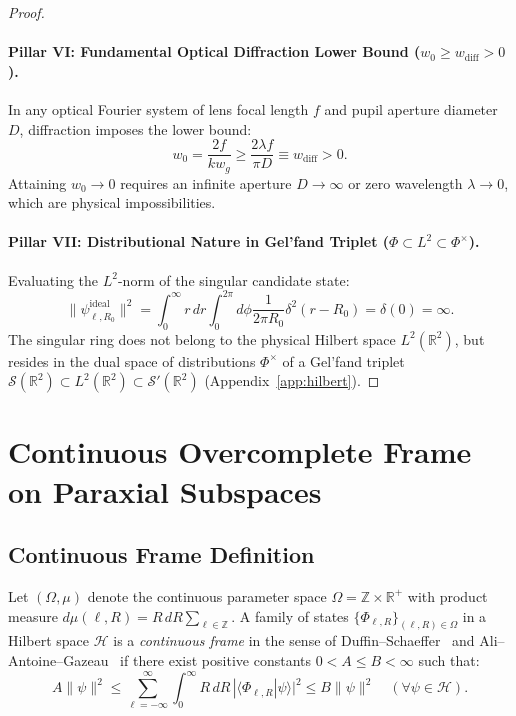 \documentclass[11pt,a4paper]{article}
\begin{document}
\begin{proof}
\paragraph{Pillar VI: Fundamental Optical Diffraction Lower Bound ($w_0 \ge w_{\text{diff}} > 0$).}
In any optical Fourier system of lens focal length $f$ and pupil aperture diameter $D$, diffraction imposes the lower bound:
\begin{equation}
\boxed{w_0 = \frac{2 f}{k w_g} \ge \frac{2 \lambda f}{\pi D} \equiv w_{\text{diff}} > 0.}
\label{eq:pillar6_result}
\end{equation}
Attaining $w_0 \to 0$ requires an infinite aperture $D \to \infty$ or zero wavelength $\lambda \to 0$, which are physical impossibilities.

\paragraph{Pillar VII: Distributional Nature in Gel'fand Triplet ($\Phi \subset L^2 \subset \Phi^\times$).}
Evaluating the $L^2$-norm of the singular candidate state:
\begin{equation}
\boxed{\|\psi_{\ell, R_0}^{\text{ideal}}\|^2 = \int_0^\infty r \, dr \int_0^{2\pi} d\phi \frac{1}{2\pi R_0} \delta^2(r - R_0) = \delta(0) = \infty.}
\label{eq:pillar7_result}
\end{equation}
The singular ring does not belong to the physical Hilbert space $L^2(\mathbb{R}^2)$, but resides in the dual space of distributions $\Phi^\times$ of a Gel'fand triplet $\mathcal{S}(\mathbb{R}^2) \subset L^2(\mathbb{R}^2) \subset \mathcal{S}'(\mathbb{R}^2)$ (Appendix~\ref{app:hilbert}).
\end{proof}

\section{Continuous Overcomplete Frame on Paraxial Subspaces}
\label{sec:frame_theory}

\subsection{Continuous Frame Definition}

Let $(\Omega, \mu)$ denote the continuous parameter space $\Omega = \mathbb{Z} \times \mathbb{R}^+$ with product measure $d\mu(\ell, R) = R \, dR \sum_{\ell \in \mathbb{Z}}$. A family of states $\{\Phi_{\ell, R}\}_{(\ell, R) \in \Omega}$ in a Hilbert space $\mathcal{H}$ is a \emph{continuous frame} in the sense of Duffin--Schaeffer~\cite{Duffin1952} and Ali--Antoine--Gazeau~\cite{Ali1993,Daubechies1990,Christensen2016} if there exist positive constants $0 < A \le B < \infty$ such that:
\begin{equation}
A \|\psi\|^2 \le \sum_{\ell=-\infty}^\infty \int_0^\infty R \, dR \, |\langle \Phi_{\ell, R} | \psi \rangle|^2 \le B \|\psi\|^2 \quad (\forall \psi \in \mathcal{H}).
\label{eq:frame_def}
\end{equation}
\end{document}

